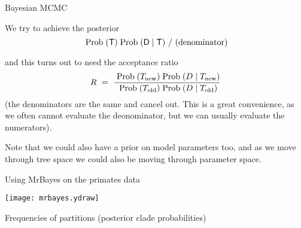\documentclass[bluish,slideColor,colorBG,pdf]{prosper}
\def\Prob{{\rm Prob\;}}
\def\prob{{\rm \;Prob\;}}
\begin{document}
% 
% 
% 
% 
% 
% 
% 
% 
% 
\begin{slide}[Replace]{Bayesian MCMC}

We try to achieve the posterior
\[
\mathsf{\prob(T) \prob(D\;|\;T) \ / \ (\rm denominator)}
\]

and this turns out to need the acceptance ratio
\[
R \ = \ \frac{\prob(T_{\rm new}) \prob(D\;|\;T_{\rm new})}{\prob(T_{\rm old}) \prob(D\;|\;T_{\rm old})}
\]
(the denominators are the same and cancel out.  This is a great convenience,
as we often cannot evaluate the deonominator, but we can usually evaluate the
numerators).
\bigskip

Note that we could also have a prior on model parameters too, and as we
move through tree space we could also be moving through parameter space.

\end{slide}

% 
% 

\begin{slide}[Replace]{Using MrBayes on the primates data}
\bigskip

\centerline{\texttt{[image: mrbayes.ydraw]}}
\bigskip

\centerline{Frequencies of partitions (posterior clade probabilities)}

\end{slide}
\end{document}
